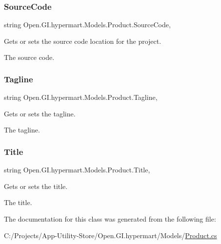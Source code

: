 \subsubsection{\texorpdfstring{Source\+Code}{SourceCode}}
{\footnotesize\ttfamily string Open.\+G\+I.\+hypermart.\+Models.\+Product.\+Source\+Code\hspace{0.3cm}{\ttfamily [get]}, {\ttfamily [set]}}



Gets or sets the source code location for the project. 

The source code. \hypertarget{class_open_1_1_g_i_1_1hypermart_1_1_models_1_1_product_ad0233eb35ac4048277a4eafde6432c43}{}\label{class_open_1_1_g_i_1_1hypermart_1_1_models_1_1_product_ad0233eb35ac4048277a4eafde6432c43} 
\subsubsection{\texorpdfstring{Tagline}{Tagline}}
{\footnotesize\ttfamily string Open.\+G\+I.\+hypermart.\+Models.\+Product.\+Tagline\hspace{0.3cm}{\ttfamily [get]}, {\ttfamily [set]}}



Gets or sets the tagline. 

The tagline. \hypertarget{class_open_1_1_g_i_1_1hypermart_1_1_models_1_1_product_a877241a61c423e91b6b630df5ca811d0}{}\label{class_open_1_1_g_i_1_1hypermart_1_1_models_1_1_product_a877241a61c423e91b6b630df5ca811d0} 
\subsubsection{\texorpdfstring{Title}{Title}}
{\footnotesize\ttfamily string Open.\+G\+I.\+hypermart.\+Models.\+Product.\+Title\hspace{0.3cm}{\ttfamily [get]}, {\ttfamily [set]}}



Gets or sets the title. 

The title. 

The documentation for this class was generated from the following file\+:\begin{DoxyCompactItemize}
\item 
C\+:/\+Projects/\+App-\/\+Utility-\/\+Store/\+Open.\+G\+I.\+hypermart/\+Models/\hyperlink{_models_2_product_8cs}{Product.\+cs}\end{DoxyCompactItemize}
